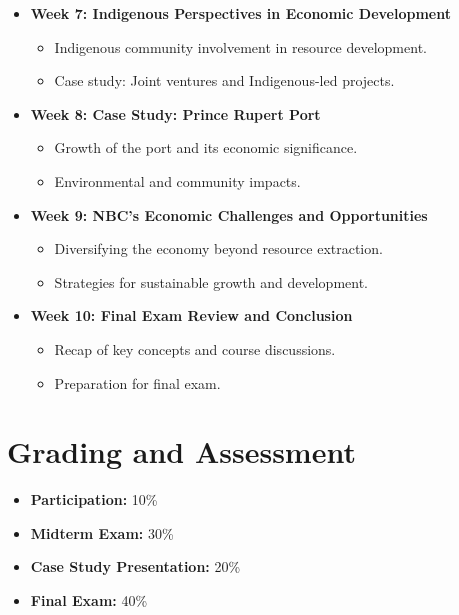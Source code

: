 \documentclass{article}
\begin{document}
\begin{itemize}
    \item \textbf{Week 7: Indigenous Perspectives in Economic Development}
    \begin{itemize}
        \item Indigenous community involvement in resource development.
        \item Case study: Joint ventures and Indigenous-led projects.
    \end{itemize}
    
    \item \textbf{Week 8: Case Study: Prince Rupert Port}
    \begin{itemize}
        \item Growth of the port and its economic significance.
        \item Environmental and community impacts.
    \end{itemize}
    
    \item \textbf{Week 9: NBC's Economic Challenges and Opportunities}
    \begin{itemize}
        \item Diversifying the economy beyond resource extraction.
        \item Strategies for sustainable growth and development.
    \end{itemize}
    
    \item \textbf{Week 10: Final Exam Review and Conclusion}
    \begin{itemize}
        \item Recap of key concepts and course discussions.
        \item Preparation for final exam.
    \end{itemize}
\end{itemize}

\section*{Grading and Assessment}
\begin{itemize}
    \item \textbf{Participation:} 10\%
    \item \textbf{Midterm Exam:} 30\%
    \item \textbf{Case Study Presentation:} 20\%
    \item \textbf{Final Exam:} 40\%
\end{itemize}
\end{document}
